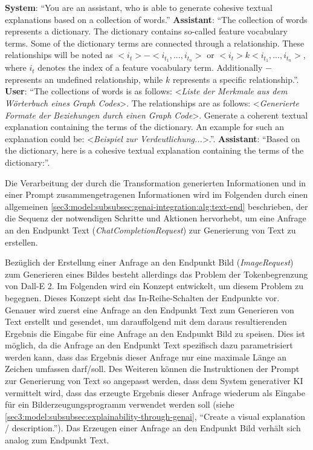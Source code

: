 \begin{tcolorbox}[enhanced, colback=white,segmentation style={solid}, breakable]
  \textbf{System}: \enquote{You are an assistant, who is able to generate cohesive textual explanations based on a collection of words.}
  \tcbline
  \textbf{Assistant}: \enquote{The collection of words represents a dictionary. The dictionary contains so-called feature vocabulary terms. Some of the dictionary terms are connected through a relationship. These relationships will be noted as $<i_{t}> - <i_{t_{1}},...,i_{t_{n}}>$ or $<i_{t}> k <i_{t_{1}},...,i_{t_{n}}>$, where $i_{t}$ denotes the index of a feature vocabulary term. Additionally $-$ represents an undefined relationship, while $k$ represents a specific relationship.}.
  \tcbline
  \textbf{User}: \enquote{The collections of words is as follows: <\textit{Liste der Merkmale aus dem Wörterbuch eines Graph Codes}>. The relationships are as follows: <\textit{Generierte Formate der Beziehungen durch einen Graph Code}>. Generate a coherent textual explanation containing the terms of the dictionary. An example for such an explanation could be: <\textit{Beispiel zur Verdeutlichung...}>.}.
  \tcbline
  \textbf{Assistant}: \enquote{Based on the dictionary, here is a cohesive textual explanation containing the terms of the dictionary:}.
\end{tcolorbox}

Die Verarbeitung der durch die Transformation generierten Informationen und in einer Prompt zusammengetragenen Informationen wird im Folgenden durch einen allgemeinen \cref{sec3:model:subsubsec:genai-integration:alg:text-end} beschrieben, der die Sequenz der notwendigen Schritte und Aktionen hervorhebt, um eine Anfrage an den Endpunkt Text (\textit{ChatCompletionRequest}) zur Generierung von Text zu erstellen.



Bezüglich der Erstellung einer Anfrage an den Endpunkt Bild (\textit{ImageRequest}) zum Generieren eines Bildes besteht allerdings das Problem der Tokenbegrenzung von Dall-E 2.
Im Folgenden wird ein Konzept entwickelt, um diesem Problem zu begegnen.
Dieses Konzept sieht das In-Reihe-Schalten der Endpunkte vor.
Genauer wird zuerst eine Anfrage an den Endpunkt Text zum Generieren von Text erstellt und gesendet, um darauffolgend mit dem daraus resultierenden Ergebnis die Eingabe für eine Anfrage an den Endpunkt Bild zu speisen.
Dies ist möglich, da die Anfrage an den Endpunkt Text spezifisch dazu parametrisiert werden kann, dass das Ergebnis dieser Anfrage nur eine maximale Länge an Zeichen umfassen darf/soll.
Des Weiteren können die Instruktionen der Prompt zur Generierung von Text so angepasst werden, dass dem System generativer KI vermittelt wird, dass das erzeugte Ergebnis dieser Anfrage wiederum als Eingabe für ein Bilderzeugungsprogramm verwendet werden soll (siehe \cref{sec3:model:subsubsec:explainability-through-genai}, \enquote{Create a visual explanation / description.}).
Das Erzeugen einer Anfrage an den Endpunkt Bild verhält sich analog zum Endpunkt Text.

